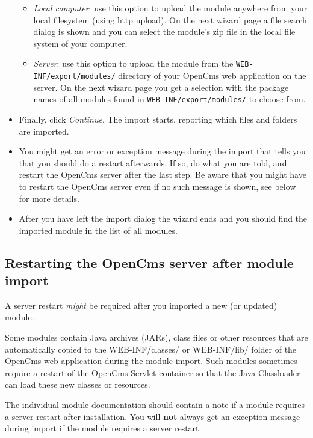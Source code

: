 \begin{itemize}
\begin{itemize}

\item {\em Local computer}: use this option to upload the module anywhere from your local filesystem 
(using http upload). On the next wizard page a file search dialog is shown and you can select the 
module's zip file in the local file system of your computer. 

\item {\em Server}: use this option to upload the module from the {\tt WEB-INF/export/modules/} directory of 
your OpenCms web application on the server.
On the next wizard page you get a selection with the package names of all modules found in 
{\tt WEB-INF/export/modules/} to choose from. 

\end{itemize}

\item Finally, click {\em Continue}. The import starts, reporting which files and folders are imported.

\item You might get an error or exception message during the import that tells you that you should do a 
restart afterwards. If so, do what you are told, and restart the OpenCms server after the last step. Be 
aware that you might have to restart the OpenCms server even if no such message is shown, see below for 
more details.

\item After you have left the import dialog the wizard ends and you should find the imported module in 
the list of all modules. 

\end{itemize}

\subsection{Restarting the OpenCms server after module import}

A server restart {\em might} be required after you imported a new (or updated) module.

Some modules contain Java archives (JARs), class files or other resources that are automatically 
copied to the WEB-INF/classes/ or WEB-INF/lib/ folder of the OpenCms web application during the module import. 
Such modules sometimes require a restart of the OpenCms Servlet container so that the Java Classloader can 
load these new classes or resources.

The individual module documentation should contain a note if a module requires a server restart after 
installation. You will {\bf not} always get an exception message during import if the module requires a server 
restart. 

